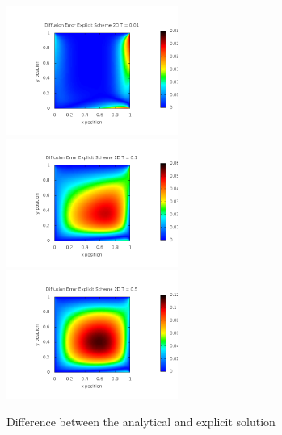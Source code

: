 \documentclass[a4wide,12pt]{article}
\begin{document}
 \begin{figure}[p]
 \includegraphics[width=0.5\textwidth]{ErrorExplicit2DT0_01}
 \includegraphics[width=0.5\textwidth]{ErrorExplicit2DT0_1}
 \includegraphics[width=0.5\textwidth]{ErrorExplicit2DT0_5}
 \caption{Difference between the analytical and explicit solution}
 \label{fig:14}
 \end{figure}
 
\end{document}
